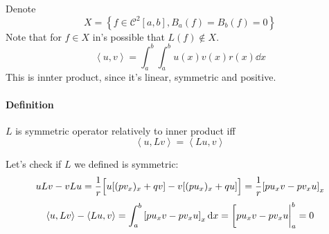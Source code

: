 Denote
$$X = \left\{ f\in \mathcal{C}^2[a,b], B_a(f)=B_b(f) = 0 \right\}$$
Note that for $f\in X$ in's possible that $L(f) \notin X$.
$$\left\langle u,v\right\rangle = \int_a^b \int_a^b u(x)v(x) r(x) \dd{x} $$
This is innter product, since it's linear, symmetric and positive.
\paragraph{Definition} $L$ is symmetric operator relatively to inner product iff
$$\left\langle u,Lv\right\rangle =\left\langle Lu,v\right\rangle $$

Let's check if $L$ we defined is symmetric:
$$uLv-vLu = \frac{1}{r}\qty\Big[u\qty[(pv_x)_x + qv ]- v\qty[(pu_x)_x + qu]] =\frac{1}{r}\qty[ pu_xv - pv_x u]_x$$
$$\left\langle u,Lv\right\rangle - \left\langle Lu,v\right\rangle = \int_a^b \qty[ pu_xv - pv_x u]_x \dd{x} = \eval[pu_xv - pv_x u|_{a}^{b} = 0$$